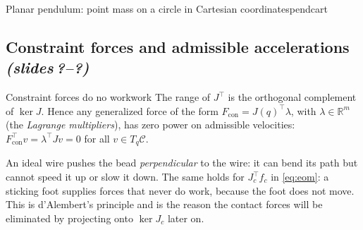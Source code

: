 \documentclass[11pt,a4paper]{article}
\newcommand{\R}{\mathbb{R}}
\newcommand{\sr}{\emph{(slides\,?--?)}}
\newcommand{\Jc}{J_c}
\begin{document}
\begin{example}{Planar pendulum: point mass on a circle in Cartesian coordinates}{pendcart}
\begin{center}
\end{center}
\end{example}

\subsection{Constraint forces and admissible accelerations \sr}

\begin{proposition}{Constraint forces do no work}{work}
The range of $J^\top$ is the orthogonal complement of $\ker J$. Hence any generalized force
of the form $F_{\mathrm{con}}=J(q)^\top\lambda$, with $\lambda\in\R^m$ (the \emph{Lagrange
multipliers}), has zero power on admissible velocities:
$F_{\mathrm{con}}^\top v=\lambda^\top J v=0$ for all $v\in T_q\mathcal C$.
\end{proposition}

\begin{intuition}
An ideal wire pushes the bead \emph{perpendicular} to the wire: it can bend its path but
cannot speed it up or slow it down. The same holds for $\Jc^\top f_c$ in \eqref{eq:eom}:
a sticking foot supplies forces that never do work, because the foot does not move. This is
d'Alembert's principle and is the reason the contact forces will be eliminated by projecting
onto $\ker\Jc$ later on.
\end{intuition}
\end{document}
